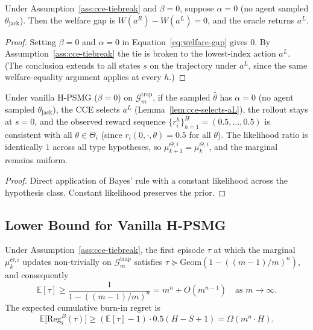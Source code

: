 \begin{lemma}
\label{lem:cce-selects-aL}
Under Assumption~\ref{ass:cce-tiebreak} and $\beta = 0$, suppose $\alpha = 0$ (no agent sampled $\theta_{\mathrm{jack}}$). Then the welfare gap is $W(a^R) - W(a^L) = 0$, and the oracle returns $a^L$.
\end{lemma}

\begin{proof}
Setting $\beta = 0$ and $\alpha = 0$ in Equation~\eqref{eq:welfare-gap} gives $0$. By Assumption~\ref{ass:cce-tiebreak} the tie is broken to the lowest-index action $a^L$. (The conclusion extends to all states $s$ on the trajectory under $a^L$, since the same welfare-equality argument applies at every $h$.)
\end{proof}

\begin{lemma}[Posterior non-update under $\alpha = 0$ rollout]
\label{lem:posterior-stuck}
Under vanilla H-PSMG ($\beta = 0$) on $\mathcal{G}_m^{\mathrm{trap}}$, if the sampled $\hat\theta$ has $\alpha = 0$ (no agent sampled $\theta_{\mathrm{jack}}$), the CCE selects $a^L$ (Lemma~\ref{lem:cce-selects-aL}), the rollout stays at $s = 0$, and the observed reward sequence $\{r^h_i\}_{h=1}^H = (0.5, \ldots, 0.5)$ is consistent with all $\theta \in \Theta_i$ (since $r_i(0, \cdot, \theta) = 0.5$ for all $\theta$). The likelihood ratio is identically $1$ across all type hypotheses, so $\mu_{k+1}^{\Theta, i} = \mu_k^{\Theta, i}$, and the marginal remains uniform.
\end{lemma}

\begin{proof}
Direct application of Bayes' rule with a constant likelihood across the hypothesis class. Constant likelihood preserves the prior.
\end{proof}

\subsection{Lower Bound for Vanilla H-PSMG}
\label{app:hpsmg-plus-lower}

\begin{proposition}
\label{prop:vanilla-burnin}
Under Assumption~\ref{ass:cce-tiebreak}, the first episode $\tau$ at which the marginal $\mu_k^{\Theta, i}$ updates non-trivially on $\mathcal{G}_m^{\mathrm{trap}}$ satisfies $\tau \succeq \mathrm{Geom}(1 - ((m-1)/m)^n)$, and consequently
\begin{equation}
\mathbb{E}[\tau] \geq \frac{1}{1 - ((m-1)/m)^n} = m^n + O(m^{n-1}) \quad \text{as } m \to \infty.
\end{equation}
The expected cumulative burn-in regret is
\begin{equation}
\mathbb{E}\big[\mathrm{Reg}_i^B(\tau)\big] \geq (\mathbb{E}[\tau] - 1) \cdot 0.5(H - S + 1) = \Omega(m^n \cdot H).
\end{equation}
\end{proposition}

